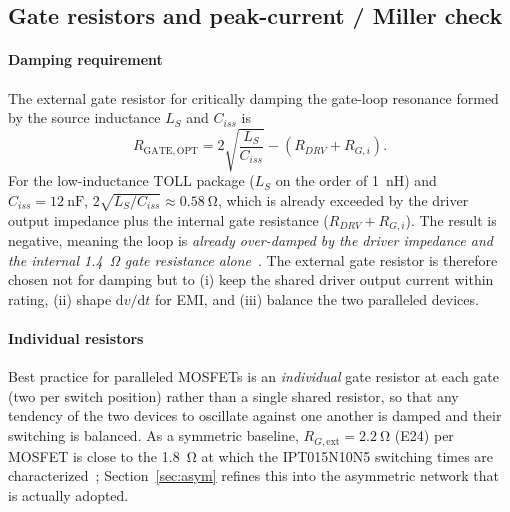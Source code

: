 \documentclass[journal,onecolumn,11pt]{IEEEtran}
\begin{document}
\subsection{Gate resistors and peak-current / Miller check}\label{sec:gateR}
\paragraph{Damping requirement}
The external gate resistor for critically damping the gate-loop resonance formed by the source
inductance $L_S$ and $C_{iss}$ is~\cite{balogh}
\begin{equation}
R_{\mathrm{GATE,OPT}} = 2\sqrt{\frac{L_S}{C_{iss}}} - (R_{DRV}+R_{G,i}).
\end{equation}
For the low-inductance TOLL package ($L_S$ on the order of \SI{1}{\nano\henry}) and
$C_{iss}=\SI{12}{\nano\farad}$, $2\sqrt{L_S/C_{iss}}\approx\SI{0.58}{\ohm}$, which is already
exceeded by the driver output impedance plus the internal gate resistance ($R_{DRV}+R_{G,i}$). The
result is negative, meaning the loop is \emph{already over-damped by the driver impedance and the
internal \SI{1.4}{\ohm} gate resistance alone}~\cite{balogh,ipt015ds}. The external gate resistor is
therefore chosen not for damping but to (i) keep the shared driver output current within rating,
(ii) shape $\mathrm{d}v/\mathrm{d}t$ for EMI, and (iii) balance the two paralleled devices.

\paragraph{Individual resistors}
Best practice for paralleled MOSFETs is an \emph{individual} gate resistor at each gate (two per
switch position) rather than a single shared resistor, so that any tendency of the two devices to
oscillate against one another is damped and their switching is balanced. As a symmetric baseline,
$R_{G,\mathrm{ext}}=\SI{2.2}{\ohm}$ (E24) per MOSFET is close to the \SI{1.8}{\ohm} at which the
IPT015N10N5 switching times are characterized~\cite{ipt015ds}; Section~\ref{sec:asym} refines this
into the asymmetric network that is actually adopted.
\end{document}
